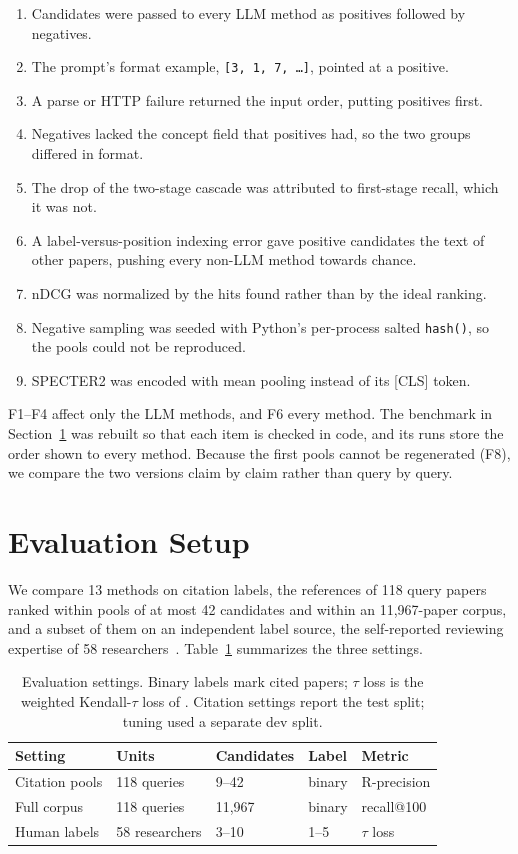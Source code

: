 \documentclass[sigconf,nonacm]{acmart}
\begin{document}
\begin{enumerate}[label=F\arabic*,leftmargin=*]
  \item Candidates were passed to every LLM method as positives followed by negatives.
  \item The prompt's format example, \texttt{[3, 1, 7, \ldots]}, pointed at a positive.
  \item A parse or HTTP failure returned the input order, putting positives first.
  \item Negatives lacked the concept field that positives had, so the two groups differed in format.
  \item The drop of the two-stage cascade was attributed to first-stage recall, which it was not.
  \item A label-versus-position indexing error gave positive candidates the text of other papers, pushing every non-LLM method towards chance.
  \item nDCG was normalized by the hits found rather than by the ideal ranking.
  \item Negative sampling was seeded with Python's per-process salted \texttt{hash()}, so the pools could not be reproduced.
  \item SPECTER2 was encoded with mean pooling instead of its [CLS] token.
\end{enumerate}
F1--F4 affect only the LLM methods, and F6 every method.
The benchmark in Section~\ref{sec:setup} was rebuilt so that each item is checked in code, and its runs store the order shown to every method.
Because the first pools cannot be regenerated (F8), we compare the two versions claim by claim rather than query by query.

\section{Evaluation Setup}
\label{sec:setup}
We compare 13 methods on citation labels, the references of 118 query papers ranked within pools of at most 42 candidates and within an 11,967-paper corpus, and a subset of them on an independent label source, the self-reported reviewing expertise of 58 researchers~\citep{stelmakh2025gold}.
Table~\ref{tab:datasets} summarizes the three settings.

\begin{table}[t]
  \caption{Evaluation settings. Binary labels mark cited papers; $\tau$ loss is the weighted Kendall-$\tau$ loss of \citet{stelmakh2025gold}. Citation settings report the test split; tuning used a separate dev split.}
  \label{tab:datasets}
  \small
  \begin{tabular}{@{}lllll@{}}
    \toprule
    Setting & Units & Candidates & Label & Metric \\
    \midrule
    Citation pools & 118 queries & 9--42 & binary & R-precision \\
    Full corpus & 118 queries & 11,967 & binary & recall@100 \\
    Human labels & 58 researchers & 3--10 & 1--5 & $\tau$ loss \\
    \bottomrule
  \end{tabular}
\end{table}
\end{document}
